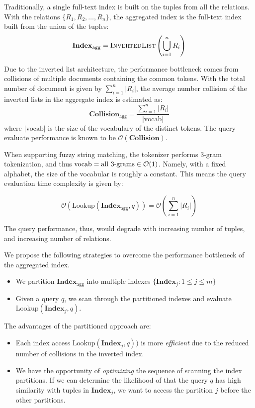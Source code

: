 \documentclass[conference]{IEEEtran}
\begin{document}
Traditionally, a single full-text index is built on the tuples from all the relations. With the relations $\{R_1, R_2, \dots, R_n\}$, the aggregated index
is the full-text index built from the union of the tuples:
$$\mathbf{Index}_\mathrm{agg} = \textsc{InvertedList}\left(\bigcup_{i=1}^n R_i\right) $$

Due to the inverted list architecture, the performance bottleneck comes
from collisions of multiple documents containing the common tokens.  With the total number of document is given by $\sum_{i=1}^n |R_i|$, the average
number collision of the inverted lists in the aggregate index is estimated as:
$$
\mathbf{Collision}_\mathrm{agg} = \frac{
  \sum_{i=1}^n |R_i|
}{
  |\mathrm{vocab}|
}
$$
where $|\mathrm{vocab}|$ is the size of the vocabulary of the distinct tokens.
The query evaluate performance is known to be $\mathcal{O}(\mathbf{Collision})$.

When supporting fuzzy string matching, the tokenizer performs 3-gram tokenization,
and thus $\mathrm{vocab} = \makebox{all 3-grams} \in\mathcal{O}(1)$.  Namely,
with a fixed alphabet, the size of the vocabular is roughly a constant.  This means
the query evaluation time complexity is given by:

$$
\mathcal{O}(\mathrm{Lookup}(\mathbf{Index}_\mathrm{agg}, q)) = \mathcal{O}\left(\sum_{i=1}^n |R_i|\right)
$$

The query performance, thus, would degrade with increasing number of tuples, and increasing number of relations.

We propose the following strategies to overcome the performance bottleneck
of the aggregated index.

\begin{itemize}
\item We partition $\mathbf{Index}_\mathrm{agg}$ into multiple indexes
  $\{\mathbf{Index}_j: 1 \leq j \leq m\}$
\item Given a query $q$, we scan through the partitioned indexes
  and evaluate $\mathrm{Lookup}(\mathbf{Index}_j, q)$.
\end{itemize}

The advantages of the partitioned approach are:

\begin{itemize}
\item Each index access $\mathrm{Lookup}(\mathbf{Index}_j, q))$ is 
more {\em efficient} due to the reduced number of collisions in
the inverted index.

\item We have the opportunity of {\em optimizing} the sequence of scanning
the index partitions.  If we can determine the likelihood
of that the query $q$ has high similarity with tuples in $\mathbf{Index}_j$, we want
to access the partition $j$ before the other partitions.
\end{itemize}
\end{document}
